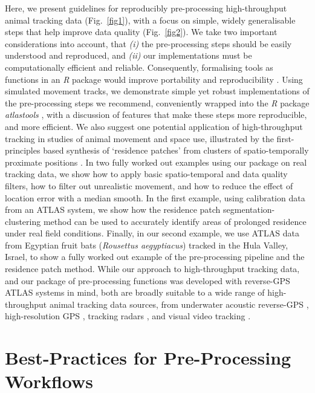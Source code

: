 \begin{refsection}
    Here, we present guidelines for reproducibly pre-processing high-throughput animal tracking data (Fig.~\ref{fig1}), with a focus on simple, widely generalisable steps that help improve data quality (Fig.~\ref{fig2}).
    We take two important considerations into account, that \textit{(i)} the pre-processing steps should be easily understood and reproduced, and \textit{(ii)} our implementations must be computationally efficient and reliable.
    Consequently, formalising tools as functions in an \textit{R} package would improve portability and reproducibility \cite{marwick2018, wickham2015}.
    Using simulated movement tracks, we demonstrate simple yet robust implementations of the pre-processing steps we recommend, conveniently wrapped into the \textit{R} package \textit{atlastools} \cite{gupte2020a}, with a discussion of features that make these steps more reproducible, and more efficient.
    We also suggest one potential application of high-throughput tracking in studies of animal movement and space use, illustrated by the first-principles based synthesis of `residence patches' from clusters of spatio-temporally proximate positions \cite[\textit{sensu}][]{bijleveld2016, oudman2018, barraquand2008}.
    In two fully worked out examples using our package on real tracking data, we show how to apply basic spatio-temporal and data quality filters, how to filter out unrealistic movement, and how to reduce the effect of location error with a median smooth.
    In the first example, using calibration data from an ATLAS system, we show how the residence patch segmentation-clustering method can be used to accurately identify areas of prolonged residence under real field conditions.
    Finally, in our second example, we use ATLAS data from Egyptian fruit bats (\textit{Rousettus aegyptiacus}) tracked in the Hula Valley, Israel, to show a fully worked out example of the pre-processing pipeline and the residence patch method.
    While our approach to high-throughput tracking data, and our package of pre-processing functions was developed with reverse-GPS ATLAS systems in mind, both are broadly suitable to a wide range of high-throughput animal tracking data sources, from underwater acoustic reverse-GPS \cite{baktoft2019, baktoft2017, jung2015, aspillaga2021, aspillaga2021a}, high-resolution GPS \cite{strandburg-peshkin2015, papageorgiou2019, harel2016, klarevas-irby2021}, tracking radars \cite{horvitz2014}, and visual video tracking \cite{rathore2020, perez-escudero2014}.

    \section*{Best-Practices for Pre-Processing Workflows}


\end{refsection}
